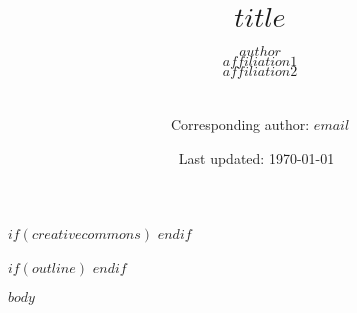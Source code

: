 \documentclass[$fontsize$]{article}
\author{
  $author$\\$affiliation1$\\$affiliation2$\\
  \smallskip\\
  \smallskip\\
  Corresponding author: $email$
}
\title{$title$}
\date{Last updated: \today\ \currenttime}
\begin{document}
\maketitle

$if(creativecommons)$
\doclicenseThis
$endif$

\thispagestyle{empty}
$if(outline)$
\tableofcontents
$endif$
\setcounter{page}{0}
\clearpage

\afterpage{\setlength\parskip{10pt}}

$body$

\end{document}
